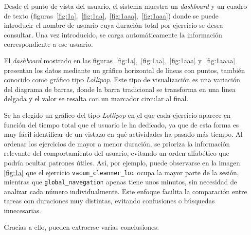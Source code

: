 \documentclass[a4paper, 12pt]{book}
\begin{document}
Desde el punto de vista del usuario, el sistema muestra un \textit{dashboard} y un cuadro de texto (figuras~\ref{fig:1a},~\ref{fig:1aa},~\ref{fig:1aaa},~\ref{fig:1aaa}) donde se puede introducir el nombre de usuario cuya duración total por ejercicio se desea consultar. Una vez introducido, se carga automáticamente la información correspondiente a ese usuario.

El \textit{dashboard} mostrado en las figuras~\ref{fig:1a},~\ref{fig:1aa},~\ref{fig:1aaa} y~\ref{fig:1aaaa} presentan los datos mediante un gráfico horizontal de líneas con puntos, también conocido como gráfico tipo \textit{Lollipop}. Este tipo de visualización es una variación del diagrama de barras, donde la barra tradicional se transforma en una línea delgada y el valor se resalta con un marcador circular al final.

Se ha elegido un gráfico del tipo \textit{Lollipop} en el que cada ejercicio aparece en función del tiempo total que el usuario le ha dedicado, ya que de esta forma es muy fácil identificar de un vistazo en qué actividades ha pasado más tiempo. Al ordenar los ejercicios de mayor a menor duración, se prioriza la información relevante del comportamiento del usuario, evitando un orden alfabético que podría ocultar patrones útiles. Así, por ejemplo, puede observarse en la imagen \ref{fig:1a} que el ejercicio \texttt{vacum\_cleanner\_loc} ocupa la mayor parte de la sesión, mientras que \texttt{global\_navegation} apenas tiene unos minutos, sin necesidad de analizar cada número individualmente. Este enfoque facilita la comparación entre tareas con duraciones muy distintas, evitando confusiones o búsquedas innecesarias.

Gracias a ello, pueden extraerse varias conclusiones:
\end{document}
